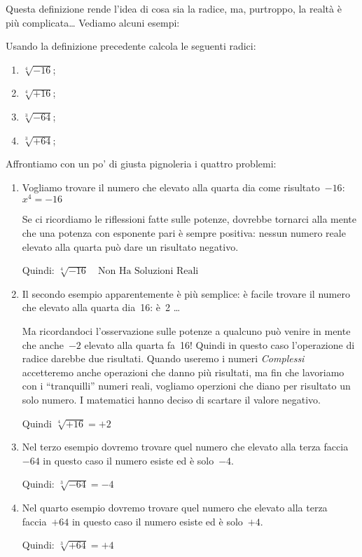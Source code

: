Questa definizione rende l'idea di cosa sia la radice, ma, purtroppo, la 
realtà è più complicata\dots 
Vediamo alcuni esempi:

\begin{esempio}
 Usando la definizione precedente calcola le seguenti radici:
 \begin{multicols}{4}
  \begin{enumerate}
   \item \(\sqrt[4]{-16}\);
   \item \(\sqrt[4]{+16}\);
   \item \(\sqrt[3]{-64}\);
   \item \(\sqrt[3]{+64}\);
  \end{enumerate}
 \end{multicols}
Affrontiamo con un po' di giusta pignoleria i quattro problemi:
\begin{enumerate}
 \item Vogliamo trovare il numero che elevato alla 
quarta dia come risultato~$-16$: \(x^4=-16\)

Se ci ricordiamo le riflessioni fatte sulle potenze, dovrebbe tornarci alla 
mente che una potenza con esponente pari è sempre positiva: nessun numero 
reale elevato alla quarta può dare un risultato negativo.

Quindi: \(\sqrt[4]{-16} \quad \text{Non Ha Soluzioni Reali}\)
 \item Il secondo esempio apparentemente è più semplice: è facile trovare 
il numero che elevato alla quarta dia~16: è~2 \dots

Ma ricordandoci l'osservazione sulle potenze a qualcuno può venire in mente 
che anche~$-2$ elevato alla quarta fa~16! 
Quindi in questo caso l'operazione di radice darebbe due risultati. Quando 
useremo i numeri \emph{Complessi} accetteremo anche operazioni che danno 
più risultati, ma fin che lavoriamo con i ``tranquilli'' numeri reali, 
vogliamo operzioni che diano per risultato un solo numero. I matematici 
hanno deciso di scartare il valore negativo.

Quindi \(\sqrt[4]{+16} = +2\)
 \item Nel terzo esempio dovremo trovare quel numero che elevato alla terza 
faccia~$-64$ in questo caso il numero esiste ed è solo~$-4$.

Quindi: \(\sqrt[3]{-64} = -4\)
 \item Nel quarto esempio dovremo trovare quel numero che elevato alla 
terza faccia~$+64$ in questo caso il numero esiste ed è solo~$+4$.

Quindi: \(\sqrt[3]{+64} = +4\)
\end{enumerate}
\end{esempio}

